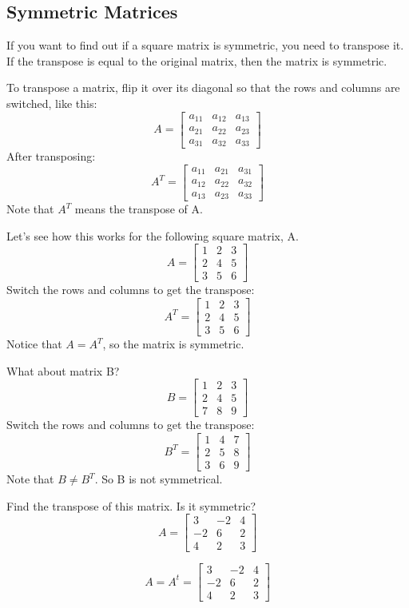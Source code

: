 \subsection{Symmetric Matrices}
If you want to find out if a square matrix is symmetric, you need to transpose it. If the transpose is equal to the original matrix, then the matrix is symmetric.

To transpose a matrix, flip it over its diagonal so that the rows and columns are switched, like this:
$$
A = \begin{bmatrix}
a_{11} & a_{12} & a_{13} \\
a_{21} & a_{22} & a_{23} \\
a_{31} & a_{32} & a_{33}
\end{bmatrix}
$$
After transposing:
$$
A^T = \begin{bmatrix}
a_{11} & a_{21} & a_{31} \\
a_{12} & a_{22} & a_{32} \\
a_{13} & a_{23} & a_{33}
\end{bmatrix}
$$
Note that $A^T$ means the transpose of A. 

Let's see how this works for the following square matrix, A.
$$
A = \begin{bmatrix}
1 & 2 & 3 \\
2 & 4 & 5 \\
3 & 5 & 6
\end{bmatrix}
$$
Switch the rows and columns to get the transpose:
$$
A^T = \begin{bmatrix}
1 & 2 & 3 \\
2 & 4 & 5 \\
3 & 5 & 6
\end{bmatrix}
$$
Notice that $A = A^T$, so the matrix is symmetric.

What about matrix B? 
$$
B = \begin{bmatrix}
1 & 2 & 3 \\
2 & 4 & 5 \\
7 & 8 & 9
\end{bmatrix}
$$
Switch the rows and columns to get the transpose:
$$
B^T = \begin{bmatrix}
1 & 4 & 7 \\
2 & 5 & 8 \\
3 & 6 & 9
\end{bmatrix}
$$
Note that $B \neq B^T$. So B is not symmetrical.

\begin{Exercise}[title={Matrix Transposition}, label=matrix-transpose01]
Find the transpose of this matrix. Is it symmetric? 
$$A = \begin{bmatrix}
 		3 &-2  &4  \\
 		-2  &6  &2 \\
 		4  &2  &3 
	  \end{bmatrix}$$
\end{Exercise}
\begin{Answer}[ref=matrix-transpose01]
$$A =  A^t = 
	  \begin{bmatrix}
 		3 &-2  &4  \\
 		-2  &6  &2 \\
 		4  &2  &3 
	\end{bmatrix}$$
\end{Answer}

